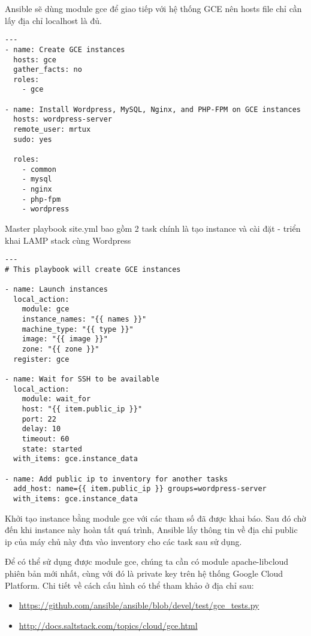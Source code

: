 Ansible sẽ dùng module gce để giao tiếp với hệ thống GCE nên hosts file chỉ cần lấy địa chỉ localhost là đủ.

\begin{lstlisting}[label={lst:labs_gce-wordpress-nginx_site},caption={Nội dung của site.yml},morekeywords={name, hosts, gather_facts: no, roles, sudo, remote_user}]
---
- name: Create GCE instances
  hosts: gce
  gather_facts: no
  roles:
    - gce

- name: Install Wordpress, MySQL, Nginx, and PHP-FPM on GCE instances
  hosts: wordpress-server
  remote_user: mrtux
  sudo: yes

  roles:
    - common
    - mysql
    - nginx
    - php-fpm
    - wordpress
\end{lstlisting}

Master playbook site.yml bao gồm 2 task chính là tạo instance và cài đặt - triển khai LAMP stack cùng Wordpress

\begin{lstlisting}[label={lst:labs_gce-wordpress-nginx_gce},caption={Nội dung của roles/gce/tasks/main.yml},morekeywords={name, local_action, module, add_host, with_items}]
---
# This playbook will create GCE instances

- name: Launch instances
  local_action:
    module: gce
    instance_names: "{{ names }}"
    machine_type: "{{ type }}"
    image: "{{ image }}"
    zone: "{{ zone }}"
  register: gce

- name: Wait for SSH to be available
  local_action:
    module: wait_for
    host: "{{ item.public_ip }}"
    port: 22
    delay: 10
    timeout: 60
    state: started
  with_items: gce.instance_data

- name: Add public ip to inventory for another tasks
  add_host: name={{ item.public_ip }} groups=wordpress-server
  with_items: gce.instance_data

\end{lstlisting}

Khởi tạo instance bằng module gce với các tham số đã được khai báo. Sau đó chờ đến khi instance này hoàn tất quá trình, Ansible lấy thông tin về địa chỉ public ip của máy chủ này đưa vào inventory cho các task sau sử dụng.

Để có thể sử dụng được module gce, chúng ta cần có module apache-libcloud phiên bản mới nhất, cùng với đó là private key trên hệ thống Google Cloud Platform. Chi tiết về cách cấu hình có thể tham khảo ở địa chỉ sau:

\begin{itemize}
\item \url{https://github.com/ansible/ansible/blob/devel/test/gce_tests.py}
\item \url{http://docs.saltstack.com/topics/cloud/gce.html}
\end{itemize}

